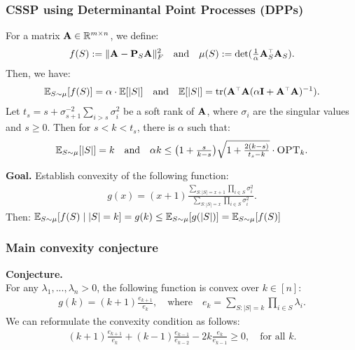 \documentclass[10pt]{beamer}
\begin{document}
\begin{frame}
  \frametitle{CSSP using Determinantal Point Processes (DPPs)}
  For a matrix $\mathbf A\in\mathbb R^{m\times n}$, we define:
  \begin{align*}
    f(S) := \|\A - \P_S\A\|_F^2\quad\text{and}\quad\mu(S) := \det(\tfrac1\alpha\A_S^\top\A_S).
  \end{align*}
  Then, we have:
  \begin{align*}
    \E_{S\sim\mu}[f(S)] = \alpha\cdot \E[|S|]
    \quad\text{and}\quad
    \E[|S|] = \tr(\A^\top\A(\alpha\I+\A^\top\A)^{-1}).
  \end{align*}
  \pause
  Let $t_s=s+\sigma_{s+1}^{-2}\sum_{i>s}\sigma_i^2$ be a soft
  rank of $\mathbf A$, where $\sigma_i$ are the singular values and $s\geq 0$. Then for $s<k<t_s$, there is $\alpha$ such that:
  \begin{align*}
\mathbb E_{S\sim\mu}[|S|]=k \quad\text{and}\quad \alpha k\leq \big(1+\tfrac
    s{k-s}\big)\sqrt{1+\tfrac{2(k-s)}{t_s-k}}\cdot{\textsc{OPT}_k}.
  \end{align*}
  \vspace{5mm}
\pause
  
  \textbf{Goal. } Establish convexity of the following function:
  \begin{align*}
  g(x) =
    (x+1)\frac{\sum_{S:|S|=x+1}\prod_{i\in
    S}\sigma_i^2}{\sum_{S:|S|=x}\prod_{i\in S}\sigma_i^2}.
  \end{align*}
  \pause
Then: 
  $\mathbb E_{S\sim\mu}[f(S)\mid |S|=k]=g(k)\leq \mathbb E_{S\sim\mu}[g(|S|)]=
    \mathbb E_{S\sim\mu}[f(S)]$
\end{frame}

\begin{frame}
  \frametitle{Main convexity conjecture}
  \textbf{Conjecture.} \\
  For any $\lambda_1,...,\lambda_n>0$, the
following function is convex over $k\in[n]$:
  \begin{align*}
g(k) = (k+1)\frac{e_{k+1}}{e_k},\quad\text{where}\quad e_k = \sum_{S:|S|=k}\prod_{i\in S}\lambda_i.
  \end{align*}
  \pause
  We can reformulate the convexity condition as follows:
  \begin{align*}
    (k+1)\frac{e_{k+1}}{e_k} + (k-1)\frac{e_{k-1}}{e_{k-2}} -
    2k\frac{e_k}{e_{k-1}}\geq 0,\quad\text{for all $k$.}
  \end{align*}
\end{frame}
\end{document}
